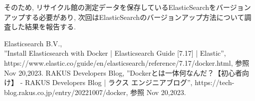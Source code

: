 \documentclass[a4j,12pt,]{jarticle}
\begin{document}
そのため, リサイクル館の測定データを保存しているElasticSearchをバージョンアップする必要があり, 次回はElasticSearchのバージョンアップ方法について調査した結果を報告する.

\begin{thebibliography}{5}
  Elasticsearch B.V.,\\ ”Install Elasticsearch with Docker | Elasticsearch Guide [7.17] | Elastic”, https://www.elastic.co/guide/en/elasticsearch/reference/7.17/docker.html, 参照 Nov 20,2023.
  RAKUS Developers Blog, ”Dockerとは一体何なんだ？【初心者向け】 - RAKUS Developers Blog | ラクス エンジニアブログ”, https://tech-blog.rakus.co.jp/entry/20221007/docker, 参照 Nov 20,2023.
\end{thebibliography}
\end{document}
